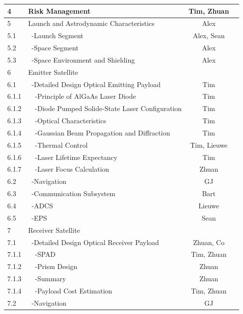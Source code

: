 \begin{center}
\begin{longtable}{|l|l|c|c|}
 4       & Risk Management                      & Tim, Zhuan & \\\hline\hline
 5       & Launch and Astrodynamic Characteristics & Alex &\\\hline
 5.1     & \ -Launch Segment                    & Alex, Sean &\\\hline
 5.2     & \ -Space Segment                     & Alex &\\\hline
 5.3     & \ -Space Environment and Shielding   & Alex &\\\hline\hline
 6       & Emitter Satellite                     &&\\\hline
 6.1     & \ -Detailed Design Optical Emitting Payload & Tim &\\\hline
 6.1.1   & \ \ -Principle of AlGaAs Laser Diode & Tim &\\\hline
 6.1.2   & \ \ -Diode Pumped Solide-State Laser Configuration & Tim &\\\hline
 6.1.3   & \ \ -Optical Characteristics        & Tim &\\\hline
 6.1.4   & \ \ -Gaussian Beam Propagation and Diffraction & Tim &\\\hline  
 6.1.5   & \ \ -Thermal Control                & Tim, Lieuwe &\\\hline
 6.1.6   & \ \ -Laser Lifetime Expectancy     & Tim &\\\hline
 6.1.7   & \ \ -Laser Focus Calculation        & Zhuan &\\\hline
 6.2     & \ -Navigation                        & GJ &\\\hline
 6.3     & \ -Communication Subsystem           & Bart &\\\hline
 6.4     & \ -ADCS                              & Lieuwe &\\\hline
 6.5     & \ -EPS                               & Sean &\\\hline
 7       & Receiver Satellite                           &&\\\hline
 7.1     & \ -Detailed Design Optical Receiver Payload & Zhuan, Co &\\\hline
 7.1.1   & \ \ -SPAD                           & Tim, Zhuan &\\\hline
 7.1.2   & \ \ -Prism Design                   & Zhuan &\\\hline
 7.1.3   & \ \ -Summary                        & Zhuan &\\\hline
 7.1.4   & \ \ -Payload Cost Estimation        & Tim, Zhuan &\\\hline
 7.2   & \ -Navigation                        & GJ &\\\hline

\end{longtable}
\end{center}
